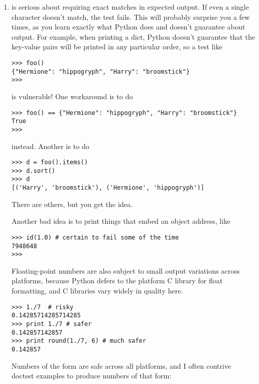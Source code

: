 \begin{enumerate}

\item {} is serious about requiring exact matches in expected
  output.  If even a single character doesn't match, the test fails.  This
  will probably surprise you a few times, as you learn exactly what Python
  does and doesn't guarantee about output.  For example, when printing a
  dict, Python doesn't guarantee that the key-value pairs will be printed
  in any particular order, so a test like

\begin{verbatim}
>>> foo()
{"Hermione": "hippogryph", "Harry": "broomstick"}
>>>
\end{verbatim}

is vulnerable!  One workaround is to do

\begin{verbatim}
>>> foo() == {"Hermione": "hippogryph", "Harry": "broomstick"}
True
>>>
\end{verbatim}

instead.  Another is to do

\begin{verbatim}
>>> d = foo().items()
>>> d.sort()
>>> d
[('Harry', 'broomstick'), ('Hermione', 'hippogryph')]
\end{verbatim}

There are others, but you get the idea.

Another bad idea is to print things that embed an object address, like

\begin{verbatim}
>>> id(1.0) # certain to fail some of the time
7948648
>>>
\end{verbatim}

Floating-point numbers are also subject to small output variations across
platforms, because Python defers to the platform C library for float
formatting, and C libraries vary widely in quality here.

\begin{verbatim}
>>> 1./7  # risky
0.14285714285714285
>>> print 1./7 # safer
0.142857142857
>>> print round(1./7, 6) # much safer
0.142857
\end{verbatim}

Numbers of the form  are safe across all platforms, and I
often contrive doctest examples to produce numbers of that form:


\end{enumerate}
